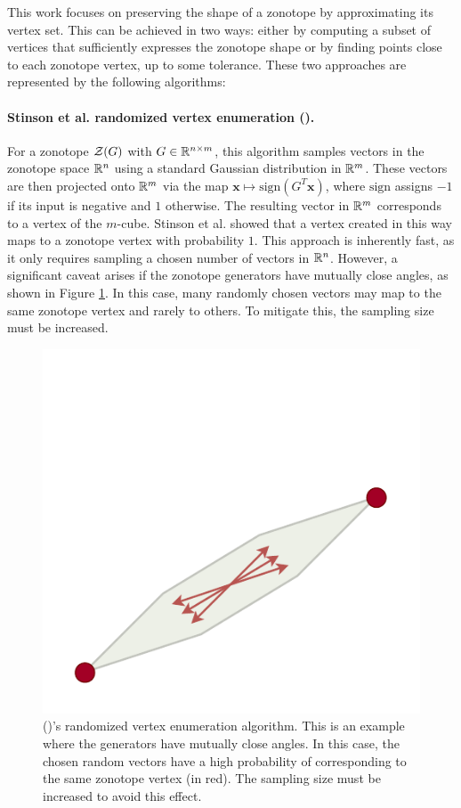 This work focuses on preserving the shape of a zonotope by approximating its vertex set. This can be achieved in two ways: either by computing a subset of vertices that sufficiently expresses the zonotope shape or by finding points close to each zonotope vertex, up to some tolerance. These two approaches are represented by the following algorithms:

\paragraph*{Stinson et al. randomized vertex enumeration (\cite{stinsonRandomizedAlgorithmEnumerating2016}).}
For a zonotope $\mathcal{Z}(G)$ with $G\in \mathbb{R}^{n\times m}$, this algorithm samples vectors in the zonotope space $\mathbb{R}^n$ using a standard Gaussian distribution in $\mathbb{R}^m$. These vectors are then projected onto $\mathbb{R}^m$ via the map $\mathbf{x}\mapsto \text{sign}(G^T\mathbf{x})$, where $\text{sign}$ assigns $-1$ if its input is negative and $1$ otherwise. The resulting vector in $\mathbb{R}^m$ corresponds to a vertex of the $m$-cube. Stinson et al. showed that a vertex created in this way maps to a zonotope vertex with probability $1$. This approach is inherently fast, as it only requires sampling a chosen number of vectors in $\mathbb{R}^n$. However, a significant caveat arises if the zonotope generators have mutually close angles, as shown in Figure \ref{fig:stinson_fail}. In this case, many randomly chosen vectors may map to the same zonotope vertex and rarely to others. To mitigate this, the sampling size must be increased.

\begin{figure}[!htb]
  \captionsetup{justification=centering}
  \centering
  \includegraphics[trim={0 0 0 80},clip, width=0.5\linewidth]{img/chapter_2/stinson_algo_fail.pdf}
  
  \caption{(\cite{stinsonRandomizedAlgorithmEnumerating2016})'s randomized vertex enumeration algorithm. This is an example where the generators have mutually close angles. In this case, the chosen random vectors have a high probability of corresponding to the same zonotope vertex (in red). The sampling size must be increased to avoid this effect.}
  \label{fig:stinson_fail}
\end{figure}

